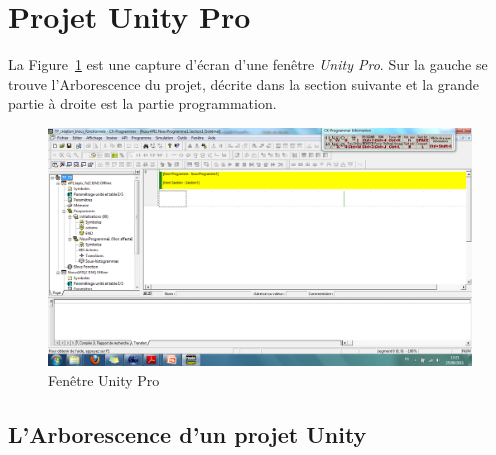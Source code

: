 \section{Projet Unity Pro}

La Figure~\ref{fig:unity_fenetre} est une capture d'écran d'une fenêtre \textit{Unity Pro}. Sur la gauche se trouve l'Arborescence du projet, décrite dans la section suivante et la grande partie à droite est la partie programmation.

\begin{figure}[hbt]
	\centering
	\includegraphics[trim = 0mm 15mm 0mm 0mm, clip,width=.7\linewidth]{images/unity_arbo}
	\caption{Fenêtre Unity Pro}
	\label{fig:unity_fenetre}
\end{figure}

\subsection{L'Arborescence d'un projet Unity}

